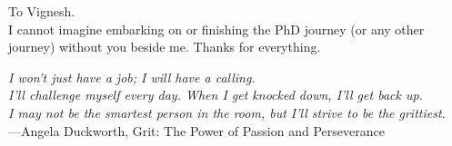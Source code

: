 %
\begin{frontmatter}

%
%
\makefrontmatter

%
%
%
%
%
%
\begin{dedication}
\begin{center}

To Vignesh.  \\
I cannot imagine embarking on or finishing the PhD journey (or any other journey) without you beside me.  Thanks for everything.

\end{center}

\end{dedication}


%
%



%
%
\begin{epigraph} %
  \emph{I won't just have a job; I will have a calling.\\
  I'll challenge myself every day.  When I get knocked down, I'll get back up.\\
    I may not be the smartest person in the room, but I'll strive to be the grittiest.}\\
  ---Angela Duckworth, Grit: The Power of Passion and Perseverance
\end{epigraph}


\end{frontmatter}
